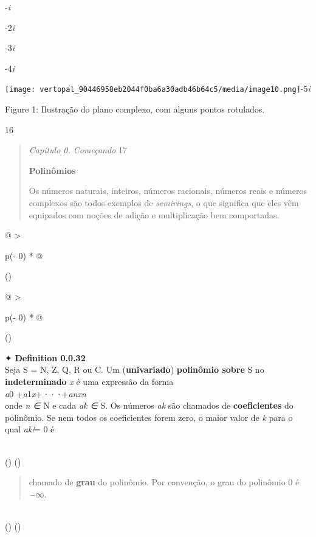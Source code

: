 \documentclass[
]{article}
\begin{document}
-\emph{i}

-2\emph{i}

-3\emph{i}

-4\emph{i}

\texttt{[image: vertopal\_90446958eb2044f0ba6a30adb46b64c5/media/image10.png]}-5\emph{i}

Figure 1: Ilustração do plano complexo, com alguns pontos rotulados.

16

\begin{quote}
\emph{Capítulo 0. Começando} 17

\textbf{Polinômios}

Os números naturais, inteiros, números racionais, números reais e
números complexos são todos exemplos de \emph{semirings}, o que
significa que eles vêm equipados com noções de adição e multiplicação
bem comportadas.
\end{quote}

\begin{longtable}[]{@{}
  >{\raggedright\arraybackslash}p{(\columnwidth - 0\tabcolsep) * }@{}}
\toprule()
\begin{minipage}[b]{\linewidth}\raggedright
\begin{longtable}[]{@{}
  >{\raggedright\arraybackslash}p{(\columnwidth - 0\tabcolsep) * }@{}}
\toprule()
\begin{minipage}[b]{\linewidth}\raggedright
✦ \textbf{Definition 0.0.32}\\
Seja S = N, Z, Q, R ou C. Um (\textbf{univariado}) \textbf{polinômio
sobre} S no \textbf{indeterminado} \emph{x} é uma expressão da forma\\
\emph{a}0 +\emph{a}1\emph{x}+\emph{···}+\emph{anxn}\\
onde \emph{n ∈} N e cada \emph{ak ∈} S. Os números \emph{ak} são
chamados de \textbf{coeficientes} do polinômio. Se nem todos os
coeficientes forem zero, o maior valor de \emph{k} para o qual \emph{ak
̸}= 0 é\strut
\end{minipage} \\
\midrule()
\endhead
\bottomrule()
\end{longtable}

\begin{quote}
chamado de \textbf{grau} do polinômio. Por convenção, o grau do
polinômio 0 é \emph{−}∞.
\end{quote}\strut
\end{minipage} \\
\midrule()
\endhead
\bottomrule()
\end{longtable}
\end{document}
